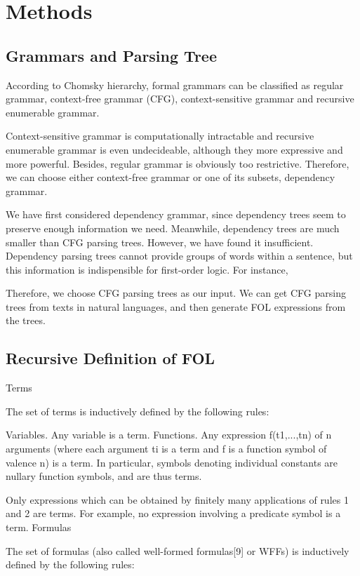\documentclass{article}
\begin{document}
\section{Methods}{
	\subsection{Grammars and Parsing Tree}{
		\cite{su}

		According to Chomsky hierarchy, formal grammars can be classified as regular grammar, context-free grammar (CFG), context-sensitive grammar and recursive enumerable grammar. 

		Context-sensitive grammar is computationally intractable and recursive enumerable grammar is even undecideable, although they more expressive and more powerful. Besides, regular grammar is obviously too restrictive. Therefore, we can choose either context-free grammar or one of its subsets, dependency grammar. 

		We have first considered dependency grammar, since dependency trees seem to preserve enough information we need. Meanwhile, dependency trees are much smaller than CFG parsing trees. However, we have found it insufficient. Dependency parsing trees cannot provide groups of words within a sentence, but this information is indispensible for first-order logic. For instance, 

		Therefore, we choose CFG parsing trees as our input. We can get CFG parsing trees from texts in natural languages, and then generate FOL expressions from the trees. 
	}

	\subsection{Recursive Definition of FOL}{
		Terms

		The set of terms is inductively defined by the following rules:

		Variables. Any variable is a term.
		Functions. Any expression f(t1,...,tn) of n arguments (where each argument ti is a term and f is a function symbol of valence n) is a term. In particular, symbols denoting individual constants are nullary function symbols, and are thus terms.

		Only expressions which can be obtained by finitely many applications of rules 1 and 2 are terms. For example, no expression involving a predicate symbol is a term.
		Formulas

		The set of formulas (also called well-formed formulas[9] or WFFs) is inductively defined by the following rules:

}}
\end{document}
